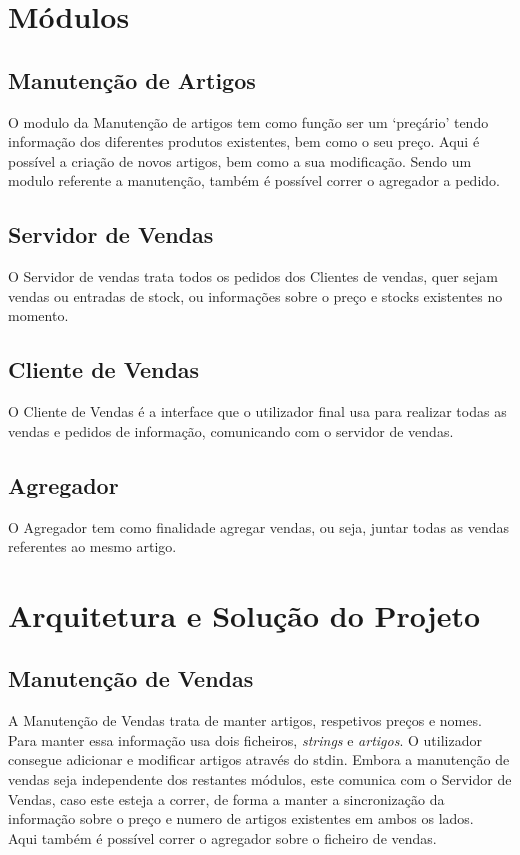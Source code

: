\documentclass[a4paper]{report}
\begin{document}
\chapter{Módulos}\label{chap:api}

\section{Manutenção de Artigos}

O modulo da Manutenção de artigos tem como função ser um `preçário'
tendo informação dos diferentes produtos existentes, bem como o seu
preço. Aqui é possível a criação de novos artigos, bem como a sua
modificação. Sendo um modulo referente a manutenção, também é possível
correr o agregador a pedido.

\section{Servidor de Vendas}

O Servidor de vendas trata todos os pedidos dos Clientes de vendas,
quer sejam vendas ou entradas de stock, ou informações sobre o preço
e stocks existentes no momento.

\section{Cliente de Vendas}

O Cliente de Vendas é a interface que o utilizador final usa para
realizar todas as vendas e pedidos de informação, comunicando com
o servidor de vendas.

\section{Agregador}

O Agregador tem como finalidade agregar vendas, ou seja, juntar
todas as vendas referentes ao mesmo artigo.

\chapter{Arquitetura e Solução do Projeto}

\section{Manutenção de Vendas}

A Manutenção de Vendas trata de manter artigos, respetivos preços
e nomes. Para manter essa informação usa dois ficheiros, \textit{strings}
e \textit{artigos}. O utilizador consegue adicionar e modificar artigos
através do stdin. Embora a manutenção de vendas seja independente dos 
restantes módulos, este comunica com o Servidor de Vendas, caso este esteja
a correr, de forma a manter a sincronização  da informação sobre o preço 
e numero de artigos existentes em ambos os lados.\\
Aqui também é possível correr o agregador sobre o ficheiro de vendas.
\end{document}
